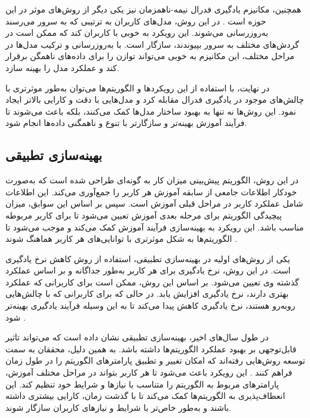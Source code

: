 همچنین، مکانیزم یادگیری فدرال نیمه-ناهمزمان%
نیز یکی دیگر از روش‌های موثر در این حوزه است
\cite{ma2021fedsa}.
در این روش، مدل‌های کاربران به ترتیبی که به سرور می‌رسند به‌روزرسانی می‌شوند. این رویکرد به خوبی با کاربران کند%
که ممکن است در گردش‌های مختلف به سرور بپیوندند، سازگار است. با به‌روزرسانی و ترکیب مدل‌ها در مراحل مختلف، این مکانیزم به خوبی می‌تواند توازن را برای داده‌های ناهمگن برقرار کند و عملکرد مدل را بهینه سازد.

در نهایت، با استفاده از این رویکردها و الگوریتم‌ها می‌توان به‌طور موثرتری با چالش‌های موجود در یادگیری فدرال مقابله کرد و مدل‌هایی با دقت و کارایی بالاتر ایجاد نمود. این روش‌ها نه تنها به بهبود ساختار مدل‌ها کمک می‌کنند، بلکه باعث می‌شوند تا فرآیند آموزش بهینه‌تر و سازگارتر با تنوع و ناهمگنی داده‌ها انجام شود.


\subsection{
	بهینه‌سازی تطبیقی
}
در این روش، الگوریتم پیش‌بینی میزان کار به گونه‌ای طراحی شده است که به‌صورت خودکار اطلاعات جامعی از سابقه آموزش هر کاربر را جمع‌آوری می‌کند. این اطلاعات شامل عملکرد کاربر در مراحل قبلی آموزش است. سپس بر اساس این سوابق، میزان پیچیدگی الگوریتم برای مرحله بعدی آموزش تعیین می‌شود تا برای کاربر مربوطه مناسب باشد. این رویکرد به بهینه‌سازی فرآیند آموزش کمک می‌کند و موجب می‌شود تا الگوریتم‌ها به شکل موثرتری با توانایی‌های هر کاربر هماهنگ شوند
\cite{li2021fedsae}.

یکی از روش‌های اولیه در بهینه‌سازی تطبیقی، استفاده از روش کاهش نرخ یادگیری است. در این روش، نرخ یادگیری برای هر کاربر به‌طور جداگانه و بر اساس عملکرد گذشته وی تعیین می‌شود. بر اساس این روش، ممکن است برای کاربرانی که عملکرد بهتری دارند، نرخ یادگیری افزایش یابد. در حالی که برای کاربرانی که با چالش‌هایی روبه‌رو هستند، نرخ یادگیری کاهش پیدا می‌کند تا به این وسیله فرآیند یادگیری بهینه‌تر شود
\cite{reddi2020adaptive}.

در طول سال‌های اخیر، بهینه‌سازی تطبیقی نشان داده است که می‌تواند تاثیر قابل‌توجهی بر بهبود عملکرد الگوریتم‌ها داشته باشد. به همین دلیل، محققان به سمت توسعه روش‌هایی رفته‌اند که امکان تغییر و تطبیق پارامترهای الگوریتم را در طول زمان فراهم کنند
\cite{reddi2020adaptive}.
این رویکرد باعث می‌شود تا هر کاربر بتواند در مراحل مختلف آموزش، پارامترهای مربوط به الگوریتم را متناسب با نیازها و شرایط خود تنظیم کند. این انعطاف‌پذیری به الگوریتم‌ها کمک می‌کند تا با گذشت زمان، کارایی بیشتری داشته باشند و به‌طور خاص‌تر با شرایط و نیازهای کاربران سازگار شوند.

